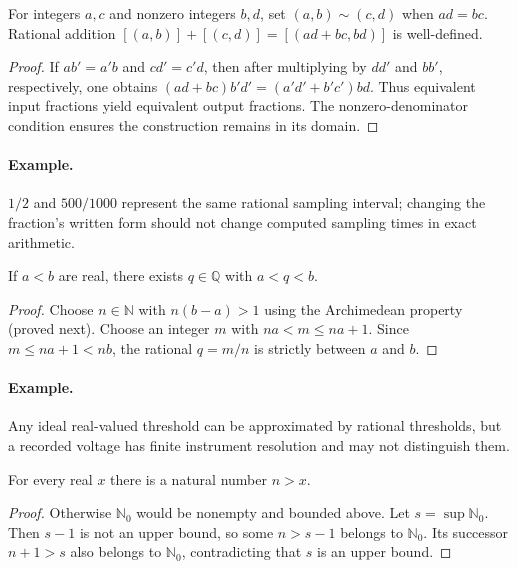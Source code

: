 

\begin{proposition}For integers $a,c$ and nonzero integers $b,d$, set $(a,b)\sim(c,d)$ when $ad=bc$. Rational addition $[(a,b)]+[(c,d)]=[(ad+bc,bd)]$ is well-defined.\end{proposition}
\begin{proof}If $ab'=a'b$ and $cd'=c'd$, then after multiplying by $dd'$ and $bb'$, respectively, one obtains $(ad+bc)b'd'=(a'd'+b'c')bd$. Thus equivalent input fractions yield equivalent output fractions. The nonzero-denominator condition ensures the construction remains in its domain.\end{proof}
\paragraph{Example.} $1/2$ and $500/1000$ represent the same rational sampling interval; changing the fraction's written form should not change computed sampling times in exact arithmetic.

\begin{proposition}If $a<b$ are real, there exists $q\in\mathbb Q$ with $a<q<b$.\end{proposition}
\begin{proof}Choose $n\in\mathbb N$ with $n(b-a)>1$ using the Archimedean property (proved next). Choose an integer $m$ with $na<m\leq na+1$. Since $m\leq na+1<nb$, the rational $q=m/n$ is strictly between $a$ and $b$.\end{proof}
\paragraph{Example.} Any ideal real-valued threshold can be approximated by rational thresholds, but a recorded voltage has finite instrument resolution and may not distinguish them.

\begin{proposition}For every real $x$ there is a natural number $n>x$.\end{proposition}
\begin{proof}Otherwise $\mathbb N_0$ would be nonempty and bounded above. Let $s=\sup\mathbb N_0$. Then $s-1$ is not an upper bound, so some $n>s-1$ belongs to $\mathbb N_0$. Its successor $n+1>s$ also belongs to $\mathbb N_0$, contradicting that $s$ is an upper bound.\end{proof}
